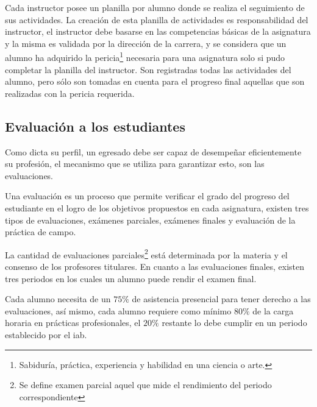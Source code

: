 Cada instructor posee un planilla por alumno donde se realiza el seguimiento de
sus actividades. La creación de esta planilla de actividades es responsabilidad
del instructor, el instructor debe basarse en las competencias básicas de la
asignatura y la misma es validada por la dirección de la carrera, y se considera
que un alumno ha adquirido la pericia\footnote{Sabiduría, práctica, experiencia y 
habilidad en una ciencia o arte.} necesaria para una asignatura solo si pudo
completar la planilla del instructor. Son registradas todas
las actividades del alumno, pero sólo son tomadas en cuenta para el progreso final 
aquellas que son realizadas con la pericia requerida.

\subsection{Evaluación a los estudiantes}
\label{sec:problema_evaluacion}

Como dicta su perfil, un egresado debe ser capaz de desempeñar eficientemente su
profesión, el mecanismo que se utiliza para garantizar esto, son las
evaluaciones.

Una evaluación es un proceso que permite verificar el grado del progreso del
estudiante en el logro de los objetivos propuestos en cada
asignatura\cite{iab:est_enfemeria}, existen tres tipos de evaluaciones, exámenes
parciales, exámenes finales y evaluación de la práctica de campo.

La cantidad de evaluaciones parciales\footnote{Se
    define examen parcial aquel que mide el rendimiento del periodo
    correspondiente\cite{iab:est_enfemeria}} está determinada por la materia y el
consenso de los profesores titulares\cite{iab:est_enfemeria}. En cuanto a las 
evaluaciones finales, existen tres periodos en los cuales un alumno puede rendir 
el examen final.





Cada alumno necesita de un $75\%$ de asistencia presencial para tener derecho a
las evaluaciones, así mismo, cada alumno requiere como mínimo $80\%$ de la carga
horaria en prácticas profesionales, el $20\%$ restante lo debe cumplir en un
periodo establecido por el \Gls{iab}.

